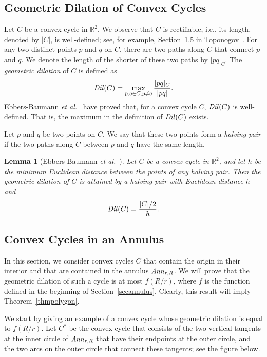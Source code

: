 \documentclass[12pt]{article}
\newtheorem{lemma}{Lemma}
\newcommand{\IR}{\mathbb{R}}
\newcommand{\Ann}{\mathord{\it Ann}}
\newcommand{\Dil}{\mathord{\it Dil}}
\begin{document}
\subsection{Geometric Dilation of Convex Cycles} 
Let $C$ be a convex cycle in $\IR^2$. We observe that $C$ is 
rectifiable, i.e., its length, denoted by $|C|$, is well-defined; 
see, for example, Section~1.5 in Toponogov~\cite{t-dgcs-06}. For any two 
distinct points $p$ and $q$ on $C$, there are two paths along $C$ that 
connect $p$ and $q$. We denote the length of the shorter of these two 
paths by $|pq|_C$. The \emph{geometric dilation} of $C$ is defined as 
\[ \Dil(C) = \max_{p,q \in C, p \neq q} \frac{|pq|_C}{|pq|} .
\]  
Ebbers-Baumann \emph{et al.}~\cite{egk-gdcpc-07} have proved that, for 
a convex cycle $C$, $\Dil(C)$ is well-defined. That is, the maximum 
in the definition of $\Dil(C)$ exists.   

Let $p$ and $q$ be two points on $C$. We say that these two points form a 
\emph{halving pair} if the two paths along $C$ between $p$ and $q$ have 
the same length. 

\begin{lemma}[Ebbers-Baumann \emph{et al.}~\cite{egk-gdcpc-07}] 
\label{lemEB}  
Let $C$ be a convex cycle in $\IR^2$, and let $h$ be the minimum 
Euclidean distance between the points of any halving pair. Then the 
geometric dilation of $C$ is attained by a halving pair with Euclidean 
distance $h$ and   
\[ \Dil(C) = \frac{|C|/2}{h} . 
\] 
\end{lemma} 

\subsection{Convex Cycles in an Annulus}  \label{secCC} 
In this section, we consider convex cycles $C$ that contain the origin 
in their interior and that are contained in the annulus $\Ann_{r,R}$. 
We will prove that the geometric dilation of such a cycle is at most 
$f(R/r)$, where $f$ is the function defined in the beginning of 
Section~\ref{secannulus}. Clearly, this result will imply  
Theorem~\ref{thmpolygon}.  

We start by giving an example of a convex cycle whose geometric dilation 
is equal to $f(R/r)$. Let $C^*$ be the convex cycle that consists of 
the two vertical tangents at the inner circle of $\Ann_{r,R}$ that have 
their endpoints at the outer circle, and the two arcs on the outer 
circle that connect these tangents; see the figure below. 
\end{document}
